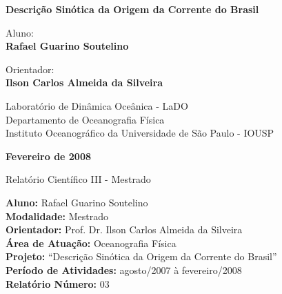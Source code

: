 \documentclass[12pt,portuguese,a4paper,pdftex]{article}
\renewcommand{\baselinestretch}{1.5}
\begin{document}
\begin{titlepage}



\vspace{2cm}

\begin{center}  

\LARGE
\textbf{Descrição Sinótica da Origem da Corrente do Brasil}\\

\end{center}
\renewcommand{\baselinestretch}{1.2}

\vspace{2cm}


\begin{center}
{\large Aluno:\\
\textbf{Rafael Guarino Soutelino}}
\end{center}


\begin{center}
{\large Orientador:\\
\textbf{Ilson Carlos Almeida da Silveira}}
\end{center}

\vspace{2cm}

\begin{center}
{\large Laboratório de Dinâmica Oceânica - LaDO\\
Departamento de Oceanografia Física\\
Instituto Oceanográfico da Universidade de São Paulo - IOUSP}
\end{center}

\vspace{2cm}

\begin{center}
{\large \textbf{Fevereiro de 2008}}
\end{center}

\vspace{2cm}

\begin{center}
{\large Relatório Científico III - Mestrado}
\end{center}

\end{titlepage}

\newpage
\pagestyle{empty}

\hspace{-7.5mm} {\bf Aluno:} Rafael Guarino Soutelino\\
{\bf Modalidade:} Mestrado \\
{\bf Orientador:} Prof. Dr. Ilson Carlos Almeida da Silveira\\
{\bf Área de Atuação:} Oceanografia Física\\
{\bf Projeto:} ``Descrição Sinótica da Origem da Corrente do Brasil''\\
{\bf Período de Atividades:} agosto/2007 à fevereiro/2008\\
{\bf Relatório Número:} 03
\end{document}
